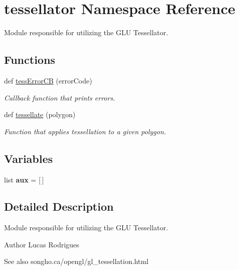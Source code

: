 \hypertarget{namespacetessellator}{}\section{tessellator Namespace Reference}
\label{namespacetessellator}


Module responsible for utilizing the G\+LU Tessellator.  


\subsection*{Functions}
\begin{DoxyCompactItemize}
\item 
def \hyperlink{namespacetessellator_a5047a345487c0e5eb12f5c4b39352aee}{tess\+Error\+CB} (error\+Code)
\begin{DoxyCompactList}\small\item\em Callback function that prints errors. \end{DoxyCompactList}\item 
def \hyperlink{namespacetessellator_a9a6e675f7596610cd3118348185ef51f}{tessellate} (polygon)
\begin{DoxyCompactList}\small\item\em Function that applies tessellation to a given polygon. \end{DoxyCompactList}\end{DoxyCompactItemize}
\subsection*{Variables}
\begin{DoxyCompactItemize}
\item 
\mbox{\label{namespacetessellator_a25b6e9fa1ab6a41e1ed8ff68f83f385a}} 
list {\bfseries aux} = \mbox{[}$\,$\mbox{]}
\end{DoxyCompactItemize}


\subsection{Detailed Description}
Module responsible for utilizing the G\+LU Tessellator. 

\begin{DoxyAuthor}{Author}
Lucas Rodrigues 
\end{DoxyAuthor}
\begin{DoxySeeAlso}{See also}
songho.\+ca/opengl/gl\+\_\+tessellation.html 
\end{DoxySeeAlso}


